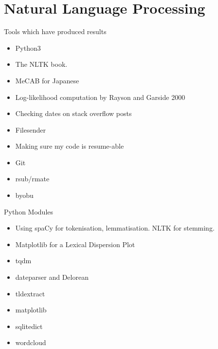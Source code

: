 \documentclass[aspectratio=1610, 11pt]{beamer} %
\begin{document}
\section{Natural Language Processing}

\begin{frame}{Tools which have produced results}

\begin{itemize}[label=\textbullet]
\item Python3
\item The NLTK book.
\item MeCAB for Japanese
\item Log-likelihood computation by Rayson and Garside 2000
\item Checking dates on stack overflow posts
\item Filesender
\item Making sure my code is resume-able
\item Git
\item rsub/rmate
\item byobu
\end{itemize}
\end{frame}
\begin{frame}{Python Modules}

\begin{itemize}[label=\textbullet]
\item Using spaCy for tokenisation, lemmatisation. NLTK for stemming.
\item Matplotlib for a Lexical Dispersion Plot
\item tqdm
\item dateparser and Delorean
\item tldextract
\item matplotlib 
\item sqlitedict
\item wordcloud
\end{itemize}
\end{frame}
\end{document}
